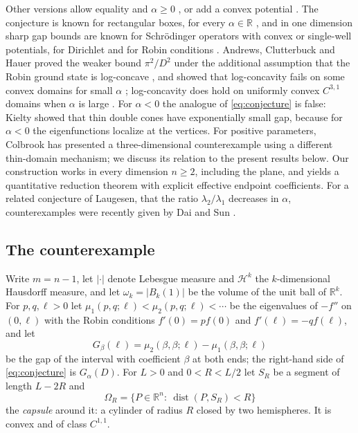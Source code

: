 \documentclass[11pt,a4paper]{article}
\numberwithin{equation}{section}
\theoremstyle{paperplain}
\theoremstyle{remark}
\newcommand{\R}{\mathbb{R}}
\newcommand{\HH}{\mathcal{H}}
\newcommand{\dist}{\operatorname{dist}}
\begin{document}
Other versions allow equality and $\alpha\ge0$ \cite{Kielty}, or add a convex
potential \cite[Section~10]{ACH}. The conjecture is known for rectangular
boxes, for every $\alpha\in\R$ \cite[Theorem~3.8]{Laugesen}, and in one
dimension sharp gap bounds are known for Schr\"odinger operators with
convex or single-well potentials, for Dirichlet \cite{Lavine} and for
Robin conditions \cite{ACH1D,AshbaughKielty}. Andrews,
Clutterbuck and Hauer proved the weaker bound $\pi^2/D^2$ under the
additional assumption that the Robin ground state is log-concave
\cite[Theorem~2.1]{ACH}, and showed that log-concavity fails on some convex
domains for small $\alpha$ \cite[Theorem~1.2]{ACH}; log-concavity does hold
on uniformly convex $C^{3,1}$ domains when $\alpha$ is large
\cite{YeZhang}. For $\alpha<0$ the analogue of
\eqref{eq:conjecture} is false: Kielty \cite{Kielty} showed that thin double
cones have exponentially small gap, because for $\alpha<0$ the eigenfunctions
localize at the vertices. For positive parameters, Colbrook
\cite{Colbrook} has presented a three-dimensional counterexample using a
different thin-domain mechanism; we discuss its relation to the present
results below. Our construction works in every dimension $n\ge2$, including
the plane, and yields a quantitative reduction theorem with explicit
effective endpoint coefficients. For a related conjecture of Laugesen,
that the ratio $\lambda_2/\lambda_1$ decreases in $\alpha$, counterexamples
were recently given by Dai and Sun \cite{DaiSun}.

\subsection{The counterexample}
Write $m=n-1$, let $|\cdot|$ denote Lebesgue measure and $\HH^k$ the
$k$-dimensional Hausdorff measure, and let $\omega_k=|B_k(1)|$ be the
volume of the unit ball of $\R^k$. For $p,q,\ell>0$ let $\mu_1(p,q;\ell)<\mu_2(p,q;\ell)<\cdots$ be the
eigenvalues of $-f''$ on $(0,\ell)$ with the Robin conditions $f'(0)=pf(0)$
and $f'(\ell)=-qf(\ell)$, and let
\begin{equation}\label{eq:G-intro}
 G_\beta(\ell)=\mu_2(\beta,\beta;\ell)-\mu_1(\beta,\beta;\ell)
\end{equation}
be the gap of the interval with coefficient $\beta$ at both ends; the
right-hand side of \eqref{eq:conjecture} is $G_\alpha(D)$. For $L>0$ and
$0<R<L/2$ let $S_R$ be a segment of length $L-2R$ and
\[
 \Omega_R=\{P\in\R^n:\ \dist(P,S_R)<R\}
\]
the \emph{capsule} around it: a cylinder of radius $R$ closed by two
hemispheres. It is convex and of class $C^{1,1}$.
\end{document}
